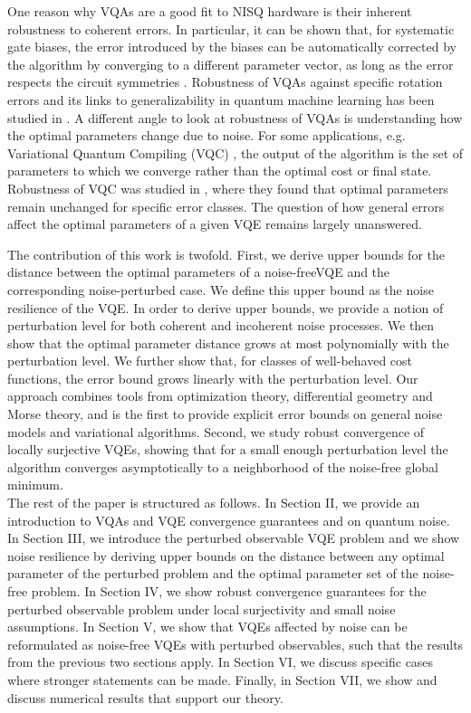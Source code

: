 \documentclass[letterpaper, 10 pt]{IEEEtran}  %
\begin{document}
One reason why VQAs are a good fit to NISQ hardware is their inherent robustness to coherent errors. In particular, it can be shown that, for systematic gate biases, 
the error introduced by the biases can be automatically corrected by the algorithm by converging to a different parameter vector, as long as the error respects the circuit symmetries \cite{McClean2016}.
Robustness of VQAs against specific rotation errors and its links to generalizability in quantum machine learning has been studied in \cite{Berberich2024a,Berberich2024b}. 
A different angle to look at robustness of VQAs is understanding how the optimal parameters change due to noise. 
For some applications, e.g. Variational Quantum Compiling (VQC) \cite{Khatri2019}, the output of the algorithm is the set of parameters 
to which we converge rather than the optimal cost or final state. Robustness of VQC was studied in \cite{Sharma2020}, where they found that 
optimal parameters remain unchanged for specific error classes. 
The question of how general errors affect the optimal parameters of a given VQE remains largely unanswered. 
\newline

The contribution of this work is twofold. First, we derive upper bounds for the distance between the optimal parameters of a noise-freeVQE and the corresponding noise-perturbed case. We define this upper bound as the noise resilience of the VQE.
In order to derive upper bounds, we provide a notion of perturbation level for both coherent and incoherent noise processes. We then show that the 
optimal parameter distance grows at most polynomially with the perturbation level.  
We further show that, for classes of well-behaved cost functions, the error bound grows linearly with the perturbation level. 
Our approach combines tools from optimization theory, differential geometry and Morse theory, and is the first to provide explicit error bounds on general noise models and variational algorithms.   
Second, we study robust convergence of locally surjective VQEs, showing that for a small enough perturbation level the algorithm converges asymptotically to a neighborhood of the noise-free global minimum.
\\

The rest of the paper is structured as follows.
In Section II, we provide an introduction to VQAs and VQE convergence guarantees and on quantum noise. 
In Section III, we introduce the perturbed observable VQE problem and we show noise resilience by deriving upper bounds on 
the distance between any optimal parameter of the perturbed problem and the optimal parameter set of the 
noise-free problem.
In Section IV, we show robust convergence guarantees for the perturbed observable problem under local surjectivity and small noise assumptions. 
In Section V, we show that VQEs affected by noise can be reformulated as noise-free VQEs with perturbed observables, such that the results from the previous two sections apply. 
In Section VI, we discuss specific cases where stronger statements can be made. 
Finally, in Section VII, we show and discuss numerical results that support our theory.
\end{document}
